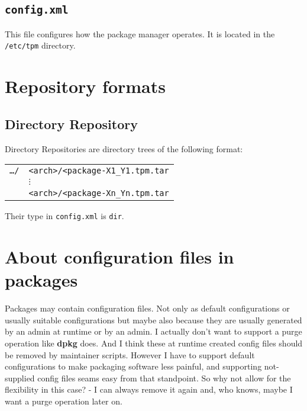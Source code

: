 \documentclass[a4paper]{scrartcl}
\newcommand{\file}[1]{\texttt{#1}}
\newcommand{\program}[1]{\textbf{#1}}
\begin{document}
	\subsection{\file{config.xml}}
	\label{ssec:config.xml}
	
	This file configures how the package manager operates. It is located in the \file{/etc/tpm} directory.
	
	\noindent

	
	\section{Repository formats}
	\label{sec:repository_formats}
	
	
	\subsection{Directory Repository}
	\label{ssec:directory_repository}
	
	Directory Repositories are directory trees of the following format:
	
	\vspace{1em}	
	\noindent
	\begin{tabular}{rl}
		\file{\dots/} & \file{<arch>/<package-X1\_Y1.tpm.tar} \\
		& \hspace{0.5cm} $\vdots$ \\
		& \file{<arch>/<package-Xn\_Yn.tpm.tar} \\
	\end{tabular}

	\vspace{1em}
	Their type in \file{config.xml} is \texttt{dir}.
	
	
	\section{About configuration files in packages}
	\label{sec:about_configuration_files_in_pacakges}
	
	Packages may contain configuration files. Not only as default configurations or usually suitable configurations but maybe also because they are usually generated by an admin at runtime or by an admin. I actually don't want to support a purge operation like \program{dpkg} does. And I think these at runtime created config files should be removed by maintainer scripts. However I have to support default configurations to make packaging software less painful, and supporting not-supplied config files seams easy from that standpoint. So why not allow for the flexibility in this case? - I can always remove it again and, who knows, maybe I want a purge operation later on.
	
\end{document}
